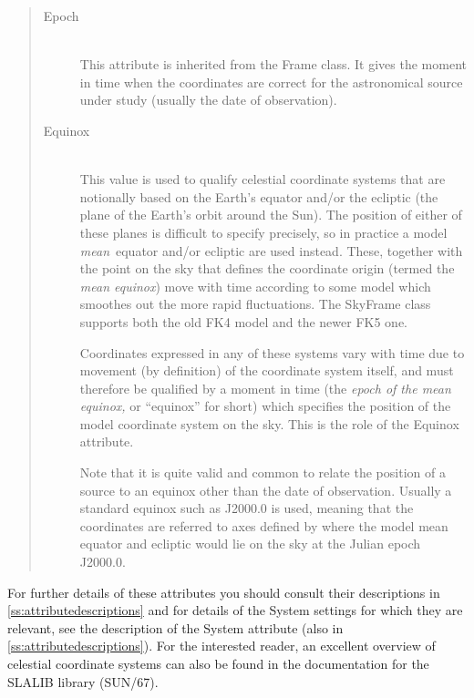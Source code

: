 \documentclass[twoside,11pt]{article}
\newcommand{\xref}[3]{#1}
\newcommand{\appref}[1]{Appendix~\ref{#1}}
\renewcommand{\appref}[1]{\ref{#1}}
\begin{document}
\begin{quote}
\begin{description}

\item[\label{ss:epochitem}Epoch]\mbox{}\\
This attribute is inherited from the Frame class. It gives the moment in
time when the coordinates are correct for the astronomical source
under study (usually the date of observation). 

\item[\label{ss:equinoxitem}Equinox]\mbox{}\\
This value is used to qualify celestial coordinate systems that are
notionally based on the Earth's equator and/or the ecliptic (the plane
of the Earth's orbit around the Sun). The position of either of these
planes is difficult to specify precisely, so in practice a model
{\em{mean}}\ equator and/or ecliptic are used instead. These, together
with the point on the sky that defines the coordinate origin (termed
the {\em{mean equinox}}) move with time according to some model which
smoothes out the more rapid fluctuations. The SkyFrame class supports
both the old FK4 model and the newer FK5 one.

Coordinates expressed in any of these systems vary with time due to
movement (by definition) of the coordinate system itself, and must
therefore be qualified by a moment in time (the {\em{epoch of the mean
equinox,}} or ``equinox'' for short) which specifies the position of
the model coordinate system on the sky. This is the role of the
Equinox attribute.

Note that it is quite valid and common to relate the position of a
source to an equinox other than the date of observation. Usually a
standard equinox such as J2000.0 is used, meaning that the coordinates
are referred to axes defined by where the model mean equator and
ecliptic would lie on the sky at the Julian epoch J2000.0.
\end{description}
\end{quote}

For further details of these attributes you should consult their
descriptions in \appref{ss:attributedescriptions} and for details of
the System settings for which they are relevant, see the description
of the System attribute (also in \appref{ss:attributedescriptions}).
For the interested reader, an excellent overview of celestial
coordinate systems can also be found in the documentation for the
SLALIB library (\xref{SUN/67}{sun67}{}).
\end{document}
